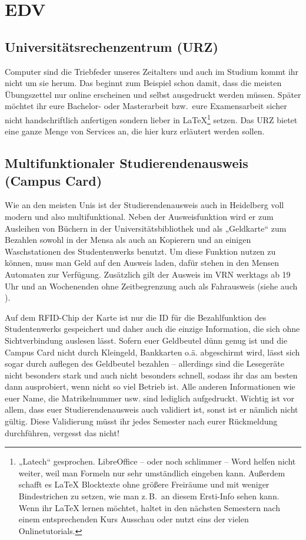 \section{EDV}

\subsection{Universitätsrechenzentrum (URZ)}
\label{urz}
Computer sind die Triebfeder unseres Zeitalters und auch im Studium kommt ihr nicht um sie herum. Das beginnt zum Beispiel schon damit, dass die meisten Übungszettel nur online erscheinen und selbst ausgedruckt werden müssen. Später möchtet ihr eure Bachelor- oder Masterarbeit bzw.\ eure Examensarbeit sicher nicht handschriftlich anfertigen sondern lieber in \LaTeX \footnote{„Latech“ gesprochen. LibreOffice -- oder noch schlimmer -- Word helfen nicht weiter, weil man Formeln nur sehr umständlich eingeben kann. Außerdem schafft es \LaTeX{} Blocktexte ohne größere Freiräume und mit weniger Bindestrichen zu setzen, wie man z.\,B.\ an diesem Ersti-Info sehen kann. Wenn ihr \LaTeX{} lernen möchtet, haltet in den nächsten Semestern nach einem entsprechenden Kurs Ausschau oder nutzt eins der vielen Onlinetutorials.} setzen. Das \gls{URZ} bietet eine ganze Menge von Services an, die hier kurz erläutert werden sollen.

\subsection{Multifunktionaler Studierendenausweis (Campus Card)}
\label{campuscard}
Wie an den meisten Unis ist der Studierendenausweis auch in Heidelberg voll modern und also multifunktional. Neben der Ausweisfunktion wird er zum Ausleihen von Büchern in der Universitätsbibliothek und als „Geldkarte“ zum Bezahlen sowohl in der Mensa als auch an Kopierern und an einigen Waschstationen des Studentenwerks benutzt. Um diese Funktion nutzen zu können, muss man Geld auf den Ausweis laden, dafür stehen in den Mensen Automaten zur Verfügung. Zusätzlich gilt der Ausweis im \gls{VRN} werktags ab 19 Uhr und an Wochenenden ohne Zeitbegrenzung auch als Fahrausweis (siehe auch ).

Auf dem RFID-Chip der Karte ist nur die ID für die Bezahlfunktion des Studentenwerks gespeichert und daher auch die einzige Information, die sich ohne Sichtverbindung auslesen lässt. Sofern euer Geldbeutel dünn genug ist und die Campus Card nicht durch Kleingeld, Bankkarten o.ä. abgeschirmt wird, lässt sich sogar durch auflegen des Geldbeutel bezahlen -- allerdings sind die Lesegeräte nicht besonders stark und auch nicht besonders schnell, sodass ihr das am besten dann ausprobiert, wenn nicht so viel Betrieb ist. Alle anderen Informationen wie euer Name, die Matrikelnummer usw. sind lediglich aufgedruckt. Wichtig ist vor allem, dass euer Studierendenausweis auch validiert ist, sonst ist er nämlich nicht gültig. Diese Validierung müsst ihr jedes Semester nach eurer Rückmeldung durchführen, vergesst das nicht!

